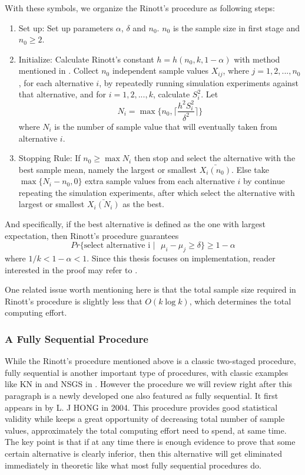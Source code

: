 \documentclass[12pt,a4paper]{report}
\begin{document}
With these symbols, we organize the Rinott's procedure as following steps:

\begin{enumerate}
\item{Set up: } Set up parameters $\alpha$, $\delta$ and $n_0$. $n_0$ is the sample size in first stage and $n_0 \geqslant 2$.
\item{Initialize: } Calculate Rinott's constant $h = h(n_0, k, 1 - \alpha)$ with method mentioned in \cite{rinott-constant}. Collect $n_0$ independent sample values $X_{ij}$, where $j = 1, 2,...,n_0$, for each alternative $i$, by repeatedly running simulation experiments against that alternative, and for $i = 1, 2,...,k$, calculate $S_i^2$. Let 
$$ N_i = \max\{n_0, \lceil \frac{h^2S_i^2}{\delta^2} \rceil\} $$ where $N_i$ is the number of sample value that will eventually taken from alternative $i$.
\item{Stopping Rule: } If $n_0 \geqslant \max N_i$ then stop and select the alternative with the best sample mean, namely the largest or smallest $\bar{X_i(n_0)}$. Else take $\max\{N_i - n_0, 0\}$ extra sample values from each alternative $i$ by continue repeating the simulation experiments, after which select the alternative with largest or smallest $\bar{X_i(N_i)}$ as the best.
\end{enumerate}

And specifically, if the best alternative is defined as the one with largest expectation, then Rinott's procedure guarantees
$$ Pr\{\text{select alternative i }|\text{ }\mu_i - \mu_j \geqslant \delta \} \geqslant 1 - \alpha $$
where $1/k < 1 - \alpha < 1$. Since this thesis focuses on implementation, reader interested in the proof may refer to \cite{ras-recent-advances}. 

One related issue worth mentioning here is that the total sample size required in Rinott's procedure is slightly less that $O(k\log{k})$, which determines the total computing effort.

\subsubsection{A Fully Sequential Procedure}

While the Rinott's procedure mentioned above is a classic two-staged procedure, fully sequential is another important type of procedures, with classic examples like KN in \cite{tomacs01kn} and NSGS in \cite{or01nsgs}. However the procedure we will review right after this paragraph is a newly developed one also featured as fully sequential. It first appears in \cite{ras-seq-jeff} by L. J HONG in 2004. This procedure provides good statistical validity while keeps a great opportunity of decreasing total number of sample values, approximately the total computing effort need to spend, at same time. The key point is that if at any time there is enough evidence to prove that some certain alternative is clearly inferior, then this alternative will get eliminated immediately in theoretic like what most fully sequential procedures do.
\end{document}

